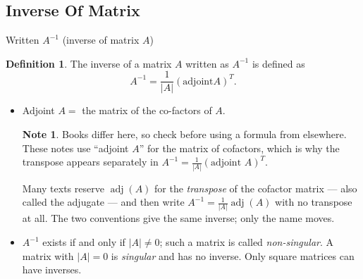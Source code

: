 \documentclass[11pt,a4paper]{article}
\theoremstyle{definition}
\newtheorem{definition}[thm]{Definition}
\newtheorem{note}[thm]{Note}
\begin{document}
\subsection{Inverse Of Matrix}
Written $A^{-1}$ (inverse of matrix $A$)\\
\begin{definition}

The inverse of a matrix $A$ written as $A^{-1}$ is defined as $$ A^{-1}=\frac{1}{|A|}(\text{adjoint}A)^T.$$
\begin{itemize}
\item Adjoint $A=$ the matrix of the co-factors of $A$.

\begin{note}
Books differ here, so check before using a formula from elsewhere. These notes use
``adjoint $A$'' for the matrix of cofactors, which is why the transpose appears
separately in $A^{-1}=\frac{1}{|A|}(\text{adjoint }A)^{T}$.

Many texts reserve $\operatorname{adj}(A)$ for the \emph{transpose} of the cofactor
matrix --- also called the adjugate --- and then write $A^{-1}=\frac{1}{|A|}
\operatorname{adj}(A)$ with no transpose at all. The two conventions give the same
inverse; only the name moves.
\end{note}
\item $A^{-1}$ exists if and only if $\left|A\right|\neq 0$; such a matrix is called \emph{non-singular}. A matrix with $\left|A\right|=0$ is \emph{singular} and has no inverse. Only square matrices can have inverses.
\end{itemize}
\end{definition}
\end{document}
